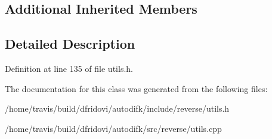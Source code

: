 \subsection*{Additional Inherited Members}


\subsection{Detailed Description}


Definition at line 135 of file utils.\-h.



The documentation for this class was generated from the following files\-:\begin{DoxyCompactItemize}
\item 
/home/travis/build/dfridovi/autodifk/include/reverse/utils.\-h\item 
/home/travis/build/dfridovi/autodifk/src/reverse/utils.\-cpp\end{DoxyCompactItemize}
